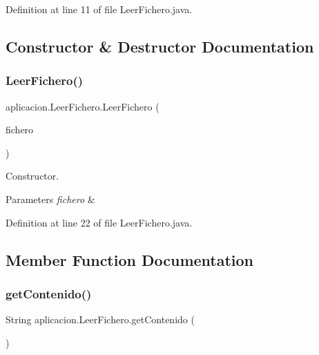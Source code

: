 Definition at line 11 of file Leer\+Fichero.\+java.



\subsection{Constructor \& Destructor Documentation}
\hypertarget{classaplicacion_1_1_leer_fichero_a6ecbade55a18cd4e748dfd664d7ede6b}{}\label{classaplicacion_1_1_leer_fichero_a6ecbade55a18cd4e748dfd664d7ede6b} 
\subsubsection{\texorpdfstring{Leer\+Fichero()}{LeerFichero()}}
{\footnotesize\ttfamily aplicacion.\+Leer\+Fichero.\+Leer\+Fichero (\begin{DoxyParamCaption}\item[{File\+Reader}]{fichero }\end{DoxyParamCaption})}

Constructor. 
\begin{DoxyParams}{Parameters}
{\em fichero} & \\
\hline
\end{DoxyParams}


Definition at line 22 of file Leer\+Fichero.\+java.



\subsection{Member Function Documentation}
\hypertarget{classaplicacion_1_1_leer_fichero_a1bbd72cd2d98a81cc7ebabae57465e7f}{}\label{classaplicacion_1_1_leer_fichero_a1bbd72cd2d98a81cc7ebabae57465e7f} 
\subsubsection{\texorpdfstring{get\+Contenido()}{getContenido()}}
{\footnotesize\ttfamily String aplicacion.\+Leer\+Fichero.\+get\+Contenido (\begin{DoxyParamCaption}{ }\end{DoxyParamCaption})}

